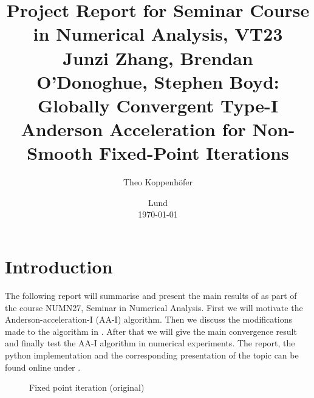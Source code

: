 




\title{ Project Report for Seminar Course in Numerical Analysis, VT23 \\[1ex]
	  \large Junzi Zhang, Brendan O'Donoghue, Stephen Boyd: Globally Convergent Type-I Anderson Acceleration for Non-Smooth Fixed-Point Iterations}
\author{Theo Koppenhöfer}
\date{Lund \\[1ex] \today}







\maketitle

\section{Introduction}

The following report will summarise and present the main results of  \cite{ZhaAA} as part of the course NUMN27, Seminar in Numerical Analysis.
First we will motivate the Anderson-acceleration-I (AA-I) algorithm.  Then we discuss the modifications made to the algorithm in \cite{ZhaAA}. After that we will give the main convergence result and finally test the AA-I algorithm in numerical experiments. The report, the python implementation and the corresponding presentation of the topic can be found online under \cite{Repository}.


\begin{figure}
\centering
\begin{algorithm}[H]
\caption{Fixed point iteration (original)}
\label{alg:original}

\BlankLine
{}
\end{algorithm}
\end{figure}

